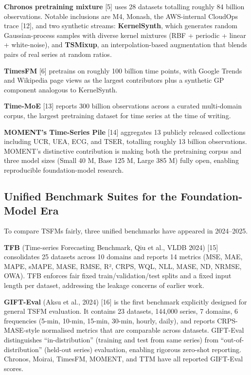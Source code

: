\textbf{Chronos pretraining mixture} {[}5{]} uses 28 datasets totalling roughly 84 billion observations. Notable inclusions are M4, Monash, the AWS-internal CloudOps trace {[}12{]}, and two synthetic streams: \textbf{KernelSynth}, which generates random Gaussian-process samples with diverse kernel mixtures (RBF + periodic + linear + white-noise), and \textbf{TSMixup}, an interpolation-based augmentation that blends pairs of real series at random ratios.

\textbf{TimesFM} {[}6{]} pretrains on roughly 100 billion time points, with Google Trends and Wikipedia page views as the largest contributors plus a synthetic GP component analogous to KernelSynth.

\textbf{Time-MoE} {[}13{]} reports 300 billion observations across a curated multi-domain corpus, the largest pretraining dataset for time series at the time of writing.

\textbf{MOMENT's Time-Series Pile} {[}14{]} aggregates 13 publicly released collections including UCR, UEA, ECG, and TSER, totalling roughly 13 billion observations. MOMENT's distinctive contribution is making both the pretraining corpus and three model sizes (Small 40 M, Base 125 M, Large 385 M) fully open, enabling reproducible foundation-model research.

\subsection{Unified Benchmark Suites for the Foundation-Model Era}\label{unified-benchmark-suites-for-the-foundation-model-era}

To compare TSFMs fairly, three unified benchmarks have appeared in 2024--2025.

\textbf{TFB} (Time-series Forecasting Benchmark, Qiu et al., VLDB 2024) {[}15{]} consolidates 25 datasets across 10 domains and reports 14 metrics (MSE, MAE, MAPE, sMAPE, MASE, RMSE, R², CRPS, WQL, NLL, MASE, ND, NRMSE, OWA). TFB enforces fair fixed train/validation/test splits and a fixed input length per dataset, addressing the leakage concerns of earlier work.

\textbf{GIFT-Eval} (Aksu et al., 2024) {[}16{]} is the first benchmark explicitly designed for general TSFM evaluation. It contains 23 datasets, 144,000 series, 7 domains, 6 frequencies (5-min, 10-min, 15-min, 30-min, hourly, daily), and reports CRPS-MASE-style normalised metrics that are comparable across datasets. GIFT-Eval distinguishes ``in-distribution'' (training and test from same series) from ``out-of-distribution'' (held-out series) evaluation, enabling rigorous zero-shot reporting. Chronos, Moirai, TimesFM, MOMENT, and TTM have all reported GIFT-Eval scores.

